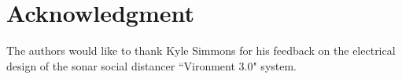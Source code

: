 \documentclass[journal]{journal}
\begin{document}


\appendices
\section*{Acknowledgment}


The authors would like to thank Kyle Simmons for his feedback on the electrical design of the sonar social distancer ``Vironment 3.0" system.


\ifCLASSOPTIONcaptionsoff
  \newpage
\fi





%
%
%
{}




% 
\end{document}
